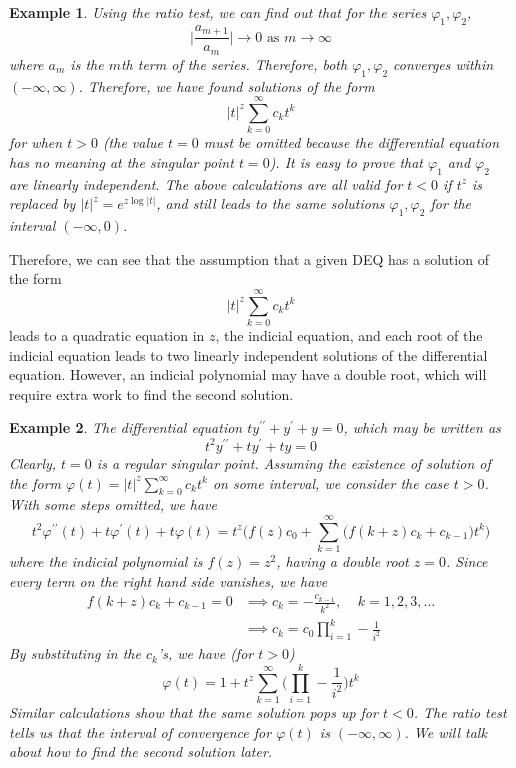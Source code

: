 \documentclass{article}
\newtheorem{example}{Example}[section]
\theoremstyle{remark}
\theoremstyle{definition}
\begin{document}
\begin{example}
      Using the ratio test, we can find out that for the series $\varphi_1, \varphi_2$, 
      \[\bigg|\frac{a_{m+1}}{a_{m}}\bigg| \rightarrow 0 \text{ as } m \rightarrow \infty\]
      where $a_m$ is the $m$th term of the series. Therefore, both $\varphi_1, \varphi_2$ converges within $(-\infty, \infty)$. Therefore, we have found solutions of the form 
      \[|t|^z \sum_{k=0}^\infty c_k t^k\]
      for when $t>0$ (the value $t=0$ must be omitted because the differential equation has no meaning at the singular point $t=0$). It is easy to prove that $\varphi_1$ and $\varphi_2$ are linearly independent. The above calculations are all valid for $t<0$ if $t^z$ is replaced by $|t|^z = e^{z \log{|t|}}$, and still leads to the same solutions $\varphi_1, \varphi_2$ for the interval $(-\infty, 0)$.
      \end{example}

      Therefore, we can see that the assumption that a given DEQ has a solution of the form 
      \[|t|^z \sum_{k=0}^\infty c_k t^k\]
      leads to a quadratic equation in $z$, the indicial equation, and each root of the indicial equation leads to two linearly independent solutions of the differential equation. However, an indicial polynomial may have a double root, which will require extra work to find the second solution. 

      \begin{example}
      The differential equation $t y^{\prime\prime} + y^\prime + y = 0$, which may be written as 
      \[t^2 y^{\prime\prime} + t y^\prime + ty = 0\]
      Clearly, $t=0$ is a regular singular point. Assuming the existence of solution of the form $\varphi(t) = |t|^z \sum_{k=0}^\infty c_k t^k$ on some interval, we consider the case $t>0$. With some steps omitted, we have
      \[t^2 \varphi^{\prime\prime} (t) + t \varphi^\prime (t) + t \varphi(t) = t^z \bigg( f(z) c_0 + \sum_{k=1}^\infty \big( f(k+z) c_k + c_{k-1} \big) t^k \bigg)\]
      where the indicial polynomial is $f(z) = z^2$, having a double root $z=0$. Since every term on the right hand side vanishes, we have
      \begin{align*}
          f(k+z) c_k + c_{k-1} = 0 & \implies c_k = -\frac{c_{k-1}}{k^2}, \;\;\;\; k = 1, 2, 3, \ldots \\
          & \implies c_k = c_0 \prod_{i=1}^k -\frac{1}{i^2}
      \end{align*}
      By substituting in the $c_k$'s, we have (for $t>0$)
      \[\varphi(t) = 1 + t^z \sum_{k=1}^\infty \bigg(\prod_{i=1}^k -\frac{1}{i^2}\bigg) t^k\]
      Similar calculations show that the same solution pops up for $t<0$. The ratio test tells us that the interval of convergence for $\varphi(t)$ is $(-\infty, \infty)$. We will talk about how to find the second solution later. 
      \end{example}
\end{document}
